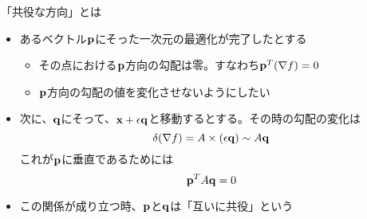 \begin{frame}[t,fragile]{「共役な方向」とは}
  \begin{itemize}
    \setlength{\itemsep}{1em}
  \item あるベクトル${\bf p}$にそった一次元の最適化が完了したとする
    \begin{itemize}
    \item その点における${\bf p}$方向の勾配は零。すなわち${\bf p}^T (\nabla f)=0$
    \item ${\bf p}$方向の勾配の値を変化させないようにしたい
  \end{itemize}
  \item 次に、${\bf q}$にそって、${\bf x}+\epsilon {\bf q}$と移動するとする。その時の勾配の変化は
    \[
      \delta(\nabla f) = A \times (\epsilon {\bf q}) \sim A {\bf q}
      \]
      これが${\bf p}$に垂直であるためには
    \[
      {\bf p}^T A {\bf q} = 0
      \]
    \item この関係が成り立つ時、${\bf p}$と${\bf q}$は「互いに共役」という
  \end{itemize}
\end{frame}
